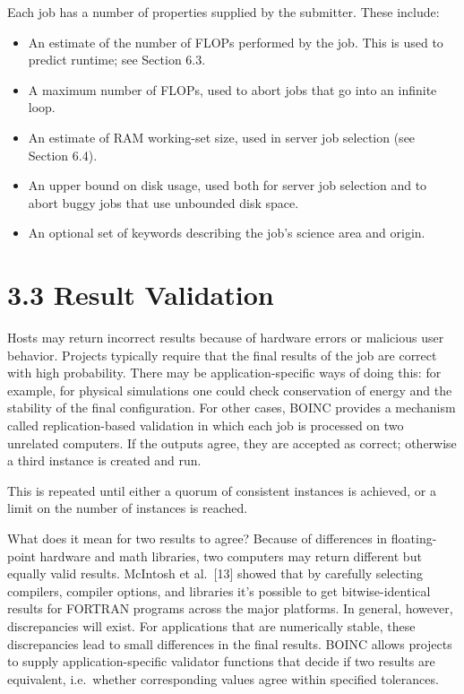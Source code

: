\documentclass[
]{article}
\providecommand{\tightlist}{%
  \setlength{\itemsep}{0pt}\setlength{\parskip}{0pt}}
\begin{document}
Each job has a number of properties supplied by the submitter. These
include:

\begin{itemize}
\tightlist
\item
  An estimate of the number of FLOPs performed by the job. This is used
  to predict runtime; see Section 6.3.\\
\item
  A maximum number of FLOPs, used to abort jobs that go into an infinite
  loop.\\
\item
  An estimate of RAM working-set size, used in server job selection (see
  Section 6.4).\\
\item
  An upper bound on disk usage, used both for server job selection and
  to abort buggy jobs that use unbounded disk space.\\
\item
  An optional set of keywords describing the job's science area and
  origin.
\end{itemize}

\section{3.3 Result Validation}\label{result-validation}

Hosts may return incorrect results because of hardware errors or
malicious user behavior. Projects typically require that the final
results of the job are correct with high probability. There may be
application-specific ways of doing this: for example, for physical
simulations one could check conservation of energy and the stability of
the final configuration. For other cases, BOINC provides a mechanism
called replication-based validation in which each job is processed on
two unrelated computers. If the outputs agree, they are accepted as
correct; otherwise a third instance is created and run.

This is repeated until either a quorum of consistent instances is
achieved, or a limit on the number of instances is reached.

What does it mean for two results to agree? Because of differences in
floating-point hardware and math libraries, two computers may return
different but equally valid results. McIntosh et al.~{[}13{]} showed
that by carefully selecting compilers, compiler options, and libraries
it's possible to get bitwise-identical results for FORTRAN programs
across the major platforms. In general, however, discrepancies will
exist. For applications that are numerically stable, these discrepancies
lead to small differences in the final results. BOINC allows projects to
supply application-specific validator functions that decide if two
results are equivalent, i.e.~whether corresponding values agree within
specified tolerances.
\end{document}
